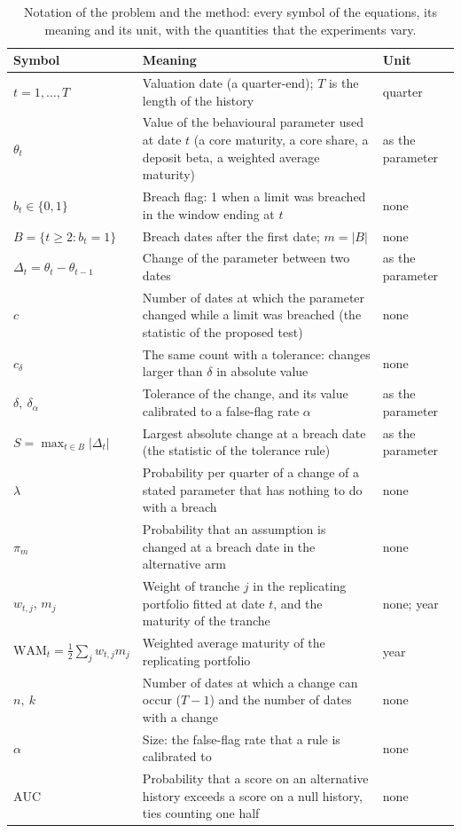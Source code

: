 \begin{table}[htbp]
\centering
\small
\caption{Notation of the problem and the method: every symbol of the equations, its meaning and its unit, with the quantities that the experiments vary.}
\label{tab:notation}
\begin{tabular}{@{}l p{8.2cm} l@{}}
\toprule
Symbol & Meaning & Unit \\
\midrule
$t=1,\dots,T$ & Valuation date (a quarter-end); $T$ is the length of the history & quarter \\
$\theta_t$ & Value of the behavioural parameter used at date $t$ (a core maturity, a core share, a deposit beta, a weighted average maturity) & as the parameter \\
$b_t\in\{0,1\}$ & Breach flag: 1 when a limit was breached in the window ending at $t$ & none \\
$B=\{t\ge 2: b_t=1\}$ & Breach dates after the first date; $m=|B|$ & none \\
$\Delta_t=\theta_t-\theta_{t-1}$ & Change of the parameter between two dates & as the parameter \\
$c$ & Number of dates at which the parameter changed while a limit was breached (the statistic of the proposed test) & none \\
$c_\delta$ & The same count with a tolerance: changes larger than $\delta$ in absolute value & none \\
$\delta,\ \delta_\alpha$ & Tolerance of the change, and its value calibrated to a false-flag rate $\alpha$ & as the parameter \\
$S=\max_{t\in B}|\Delta_t|$ & Largest absolute change at a breach date (the statistic of the tolerance rule) & as the parameter \\
$\lambda$ & Probability per quarter of a change of a stated parameter that has nothing to do with a breach & none \\
$\pi_m$ & Probability that an assumption is changed at a breach date in the alternative arm & none \\
$w_{t,j}$, $m_j$ & Weight of tranche $j$ in the replicating portfolio fitted at date $t$, and the maturity of the tranche & none; year \\
$\mathrm{WAM}_t=\tfrac12\sum_j w_{t,j}m_j$ & Weighted average maturity of the replicating portfolio & year \\
$n,\ k$ & Number of dates at which a change can occur ($T-1$) and the number of dates with a change & none \\
$\alpha$ & Size: the false-flag rate that a rule is calibrated to & none \\
$\mathrm{AUC}$ & Probability that a score on an alternative history exceeds a score on a null history, ties counting one half & none \\
\bottomrule
\end{tabular}
\end{table}
